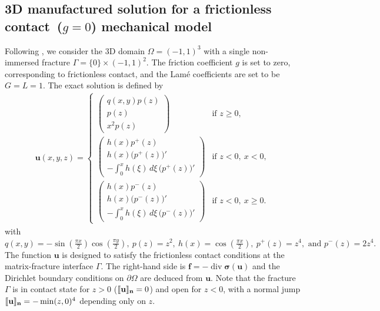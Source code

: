 \documentclass[a4paper,11pt]{article}
\theoremstyle{definition}
\theoremstyle{remark}
\newcommand{\bo}[1]{\mathbf{#1}}
\newcommand{\bos}[1]{\boldsymbol{#1}}
\def\sjump#1{[\hskip -1.5pt[#1]\hskip -1.5pt]}
\def\[{\partial}
\newcommand{\DIV}{\operatorname{\mathrm{div}}}
\begin{document}
\subsection{3D manufactured solution for a frictionless contact~($g=0$) mechanical model}\label{subsec.6.1}

Following \cite{droniou2023bubble}, we consider the 3D domain $\Omega = (-1,1)^3$ with a single non-immersed fracture 
$\Gamma = \{0\} \times (-1,1)^2$. 
The friction coefficient $g$ is set to zero, corresponding to frictionless contact, 
and the Lam\'e coefficients are set to be $G = L = 1$. The exact solution is defined by
\begin{align*}%
\bo{u}(x,y,z) =
\begin{cases}
\begin{pmatrix}
q(x,y)p(z)\\[4pt]
p(z)\\[4pt]
x^2p(z)
\end{pmatrix} & \text{if } z \ge 0,\\[12pt]
\begin{pmatrix}
h(x)p^{+}(z)\\[4pt]
h(x)\big(p^{+}(z)\big)'\\[4pt]
-\displaystyle\int_{0}^{x}h(\xi)\,d\xi\,\big(p^{+}(z)\big)'
\end{pmatrix} & \text{if } z<0,~x<0,\\[16pt]
\begin{pmatrix}
h(x)p^{-}(z)\\[4pt]
h(x)\big(p^{-}(z)\big)'\\[4pt]
-\displaystyle\int_{0}^{x}h(\xi)\,d\xi\,\big(p^{-}(z)\big)'
\end{pmatrix} & \text{if } z<0,~x\ge 0.
\end{cases}
\end{align*}
with
$q(x,y) = -\sin\left(\frac{\pi x}{2}\right)\cos\left(\frac{\pi y}{2}\right),~p(z) = z^2, ~h(x) = \cos\left(\frac{\pi x}{2}\right),~p^{+}(z) = z^4,\text{ and }p^{-}(z) = 2z^4.$ The function $\bo{u}$ is designed to satisfy the frictionless contact conditions 
at the matrix-fracture interface $\Gamma$. The right-hand side is $\bo{f} = -\DIV\bos{\sigma}(\bo{u})$ and the Dirichlet boundary conditions on $\partial\Omega$ are deduced from $\bo{u}$. Note that the fracture $\Gamma$ is in contact state for $z>0$ ($\sjump{\bo{u}}_{\bo{n}}=0$) and open for $z<0$, with a normal jump $\sjump{\bo{u}}_{\bo{n}} = -\min(z,0)^4$ depending only on $z$. 
\end{document}
